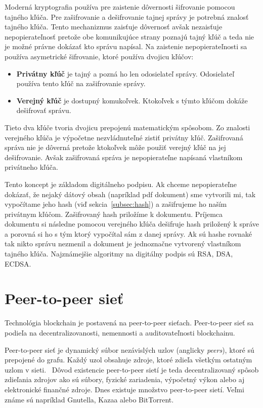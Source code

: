 Moderná kryptografia používa pre zaistenie dôvernosti šifrovanie pomocou tajného kľúča. Pre zašifrovanie a dešifrovanie tajnej správy je potrebná znalosť tajného kľúča. Tento mechanizmus  zaisťuje dôvernosť avšak nezaisťuje nepopierateľnosť pretože obe komunikujúce strany poznajú tajný kľúč a teda nie je možné právne dokázať kto správu napísal. Na zaistenie nepopierateľnosti sa používa asymetrické šifrovanie, ktoré používa dvojicu kľúčov:
\begin{itemize}
	\item \textbf{Privátny kľúč} je tajný a pozná ho len odosielateľ správy. Odosielateľ používa tento kľúč na zašifrovanie správy.
	\item \textbf{Verejný kľúč} je dostupný komukoľvek. Ktokoľvek s týmto kľúčom dokáže dešifrovať správu.
\end{itemize}
Tieto dva kľúče tvoria dvojicu prepojenú matematickým spôsobom. Zo znalosti verejného kľúča je výpočetne nezvládnuteľné zistiť privátny kľúč. Zašifrovaná správa nie je dôverná pretože ktokoľvek môže použiť verejný kľúč na jej dešifrovanie. Avšak zašifrovaná správa je nepopierateľne napísaná vlastníkom privátneho kľúča. 

Tento koncept je základom digitálneho podpisu. Ak chceme nepopierateľne dokázať, že nejaký dátový obsah (napríklad pdf dokument) sme vytvorili mi, tak vypočítame jeho hash (viď sekcia~\ref{subsec:hash}) a zašifrujeme ho naším privátnym kľúčom. Zašifrovaný hash priložíme k dokumentu. Príjemca dokumentu si následne pomocou verejného kľúča dešifruje hash priložený k správe a porovná si ho s tým ktorý vypočítal sám z danej správy. Ak sú hashe rovnaké tak nikto správu nezmenil a dokument je jednoznačne vytvorený vlastníkom tajného kľúča. Najznámejšie algoritmy na digitálny podpis sú RSA, DSA, ECDSA.~\cite{cryptoHandbook}


\section{Peer-to-peer sieť}\label{sec:p2p}

Technológia blockchain je postavená na peer-to-peer sieťach. Peer-to-peer sieť sa podieľa na decentralizovanosti, nemennosti a auditovateľnosti blockchainu. 

Peer-to-peer sieť je dynamický súbor nezávislých uzlov (anglicky \textit{peers}), ktoré sú prepojené do grafu. Každý uzol obsahuje zdroje, ktoré zdieľa všetkým ostatným uzlom v sieti.~\cite{p2pBuford, p2pSchollmeier} Dôvod existencie peer-to-peer sietí je teda decentralizovaný spôsob zdieľania zdrojov ako sú súbory, fyzické zariadenia, výpočetný výkon alebo aj elektronické finančné zdroje. Dnes existuje množstvo peer-to-peer sietí. Veľmi známe sú napríklad Gnutella, Kazaa alebo BitTorrent.~\cite{p2pEssence}

